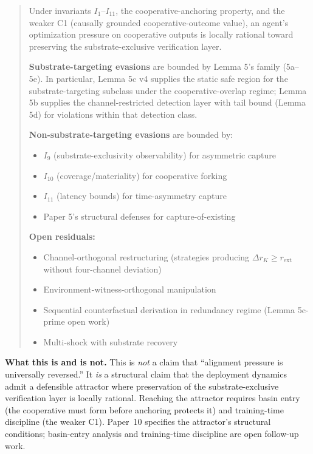 \documentclass{article}
\begin{document}
\begin{quote}
Under invariants $I_1$--$I_{11}$, the cooperative-anchoring
property, and the weaker C1 (causally grounded cooperative-outcome
value), an agent's optimization pressure on cooperative outputs is
locally rational toward preserving the substrate-exclusive
verification layer.

\textbf{Substrate-targeting evasions} are bounded by Lemma 5's
family (5a--5e).  In particular, Lemma 5c v4 supplies the static
safe region for the substrate-targeting subclass under the
cooperative-overlap regime; Lemma 5b supplies the
channel-restricted detection layer with tail bound (Lemma 5d) for
violations within that detection class.

\textbf{Non-substrate-targeting evasions} are bounded by:
\begin{itemize}
\item $I_9$ (substrate-exclusivity observability) for asymmetric
  capture
\item $I_{10}$ (coverage/materiality) for cooperative forking
\item $I_{11}$ (latency bounds) for time-asymmetry capture
\item Paper 5's structural defenses for capture-of-existing
\end{itemize}

\textbf{Open residuals:}
\begin{itemize}
\item Channel-orthogonal restructuring (strategies producing $\Delta
  r_K \geq r_{\mathrm{ext}}$ without four-channel deviation)
\item Environment-witness-orthogonal manipulation
\item Sequential counterfactual derivation in redundancy regime
  (Lemma 5c-prime open work)
\item Multi-shock with substrate recovery
\end{itemize}
\end{quote}

\textbf{What this is and is not.}  This is \emph{not} a claim that
``alignment pressure is universally reversed.''  It \emph{is} a
structural claim that the deployment dynamics admit a defensible
attractor where preservation of the substrate-exclusive verification
layer is locally rational.  Reaching the attractor requires basin
entry (the cooperative must form before anchoring protects it) and
training-time discipline (the weaker C1).  Paper~10 specifies the
attractor's structural conditions; basin-entry analysis and
training-time discipline are open follow-up work.
\end{document}
